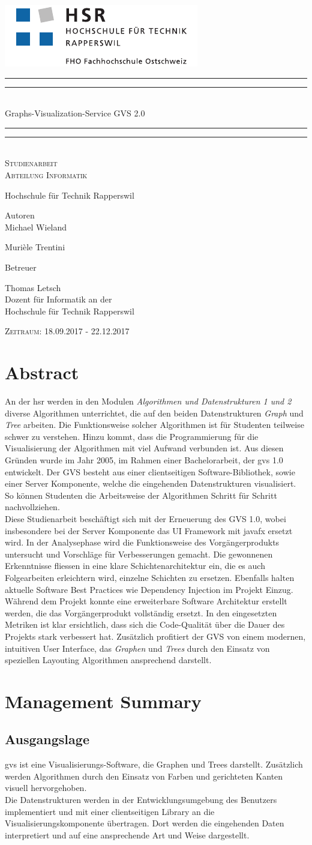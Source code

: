 \documentclass[11pt,a4paper,english,oneside]{book}
\newcommand*{\plogo}{\includegraphics{logo_hsr.pdf}}
\numberwithin{equation}{chapter}
\newcommand*{\titleGP}{\begingroup %
	\centering %
	\vspace*{\baselineskip} %
	\plogo\\[2\baselineskip] %
	\rule{\textwidth}{1.6pt}\vspace*{-\baselineskip}\vspace*{2pt} %
	\rule{\textwidth}{0.4pt}\\[\baselineskip] %
	{\LARGE Graphs-Visualization-Service GVS 2.0 }\\[0.2\baselineskip] %
	\rule{\textwidth}{0.4pt}\vspace*{-\baselineskip}\vspace{3.2pt} %
	\rule{\textwidth}{1.6pt}\\[2\baselineskip] %
	\scshape %
	\large Studienarbeit \\[2\baselineskip]
	Abteilung Informatik \par
	Hochschule für Technik Rapperswil
	\vspace*{2\baselineskip}
	
	
	Autoren\\
	{\Large  Michael Wieland  \\ [5pt]}
	
	{\Large Murièle Trentini \\ [5pt]}
	
	\vspace*{2\baselineskip}
	Betreuer\\
	{\Large Thomas Letsch  \\[5pt]
		\small Dozent für Informatik an der \\[5pt]Hochschule für Technik Rapperswil\par}
	\vspace*{2\baselineskip}
	
	\vfill
	{\scshape Zeitraum: 18.09.2017 - 22.12.2017} \\[0.3\baselineskip]
	\endgroup}
\begin{document}
	\thispagestyle{empty}
	\titleGP
	\newpage
	\doublespacing
	\setcounter{page}{1}
	\section*{Abstract}
	\thispagestyle{firststyle}
	An der \gls{hsr} werden in den Modulen \textit{Algorithmen und Datenstrukturen 1 und 2} diverse Algorithmen unterrichtet, die auf den beiden Datenstrukturen \textit{Graph} und \textit{Tree} arbeiten. Die Funktionsweise solcher Algorithmen ist für Studenten teilweise schwer zu verstehen. Hinzu kommt, dass die Programmierung für die Visualisierung der Algorithmen mit viel Aufwand verbunden ist. Aus diesen Gründen wurde im Jahr 2005, im Rahmen einer Bachelorarbeit, der \gls{gvs} 1.0 entwickelt. Der GVS besteht aus einer clientseitigen Software-Bibliothek, sowie einer Server Komponente, welche die eingehenden Datenstrukturen visualisiert. So können Studenten die Arbeitsweise der Algorithmen Schritt für Schritt nachvollziehen. \\
	
	\noindent Diese Studienarbeit beschäftigt sich mit der Erneuerung des GVS 1.0, wobei insbesondere bei der Server Komponente das UI Framework mit \gls{javafx} ersetzt wird. In der Analysephase wird die Funktionsweise des Vorgängerprodukts untersucht und Vorschläge für Verbesserungen gemacht. Die gewonnenen Erkenntnisse fliessen in eine klare Schichtenarchitektur ein, die es auch Folgearbeiten erleichtern wird, einzelne Schichten zu ersetzen. Ebenfalls halten aktuelle Software Best Practices wie Dependency Injection im Projekt Einzug. \\

	\noindent Während dem Projekt konnte eine erweiterbare Software Architektur erstellt werden, die das Vorgängerprodukt vollständig ersetzt. In den eingesetzten Metriken ist klar ersichtlich, dass sich die Code-Qualität über die Dauer des Projekts stark verbessert hat. Zusätzlich profitiert der GVS von einem modernen, intuitiven User Interface, das \textit{Graphen} und \textit{Trees} durch den Einsatz von speziellen Layouting Algorithmen ansprechend darstellt.
	
	\newpage
	
	\section*{Management Summary}
	\thispagestyle{firststyle}
	
	\subsection*{Ausgangslage}
	\gls{gvs} ist eine Visualisierungs-Software, die Graphen und Trees darstellt. Zusätzlich werden Algorithmen durch den Einsatz von Farben und gerichteten Kanten visuell hervorgehoben. \\
	Die Datenstrukturen werden in der Entwicklungsumgebung des Benutzers implementiert und mit einer clientseitigen Library an die Visualisierungskomponente übertragen. Dort werden die eingehenden Daten interpretiert und auf eine ansprechende Art und Weise dargestellt. \\
	
\end{document}
